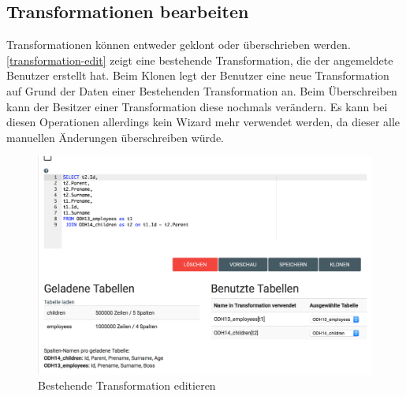 \subsection{Transformationen bearbeiten}
Transformationen können entweder geklont oder überschrieben werden. \cref{transformation-edit} zeigt eine bestehende Transformation, die der angemeldete Benutzer erstellt hat. Beim Klonen legt der Benutzer eine neue Transformation auf Grund der Daten einer Bestehenden Transformation an. Beim Überschreiben kann der Besitzer einer Transformation diese nochmals verändern. Es kann bei diesen Operationen allerdings kein Wizard mehr verwendet werden, da dieser alle manuellen Änderungen überschreiben würde.
\begin{figure}[H]
\centering
\includegraphics[width=\linewidth]{fig/transformation-edit.png}
\caption{Bestehende Transformation editieren}
\label{fig:pd:transformation-edit}
\end{figure}